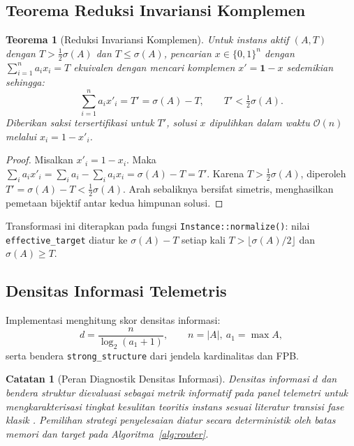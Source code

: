 \documentclass[journal,onecolumn,11pt]{IEEEtran}
\newtheorem{theorem}{Teorema}
\newtheorem{remark}{Catatan}
\begin{document}
\subsection{Teorema Reduksi Invariansi Komplemen}
\begin{theorem}[Reduksi Invariansi Komplemen]
\label{thm:complement}
Untuk instans aktif $(A,T)$ dengan $T > \tfrac{1}{2}\sigma(A)$ dan $T \le \sigma(A)$, pencarian $x \in \{0,1\}^n$ dengan $\sum_{i=1}^n a_i x_i = T$ ekuivalen dengan mencari komplemen $x' = \mathbf{1}-x$ sedemikian sehingga:
\begin{equation}
    \sum_{i=1}^n a_i x'_i = T' = \sigma(A) - T, \qquad T' < \tfrac{1}{2}\sigma(A).
\end{equation}
Diberikan saksi tersertifikasi untuk $T'$, solusi $x$ dipulihkan dalam waktu $\mathcal{O}(n)$ melalui $x_i = 1 - x'_i$.
\end{theorem}
\begin{proof}
Misalkan $x'_i = 1-x_i$. Maka $\sum_i a_i x'_i = \sum_i a_i - \sum_i a_i x_i = \sigma(A) - T = T'$. Karena $T > \tfrac12\sigma(A)$, diperoleh $T' = \sigma(A)-T < \tfrac12\sigma(A)$. Arah sebaliknya bersifat simetris, menghasilkan pemetaan bijektif antar kedua himpunan solusi.
\end{proof}
Transformasi ini diterapkan pada fungsi \texttt{Instance::normalize()}: nilai \texttt{effective\_target} diatur ke $\sigma(A)-T$ setiap kali $T > \lfloor \sigma(A)/2 \rfloor$ dan $\sigma(A) \ge T$.

\subsection{Densitas Informasi Telemetris}
Implementasi menghitung skor densitas informasi:
\begin{equation}
    d = \frac{n}{\log_2(a_1 + 1)}, \qquad n = |A|,\ a_1 = \max A,
    \label{eq:density_formula}
\end{equation}
serta bendera \texttt{strong\_structure} dari jendela kardinalitas dan FPB.

\begin{remark}[Peran Diagnostik Densitas Informasi]
\label{rem:density-not-routing}
Densitas informasi $d$ dan bendera struktur dievaluasi sebagai metrik informatif pada panel telemetri untuk mengkarakterisasi tingkat kesulitan teoritis instans sesuai literatur transisi fase klasik \cite{lagarias1985solving, coster1992improved}. Pemilihan strategi penyelesaian diatur secara deterministik oleh batas memori dan target pada Algoritma~\ref{alg:router}.
\end{remark}
\end{document}
